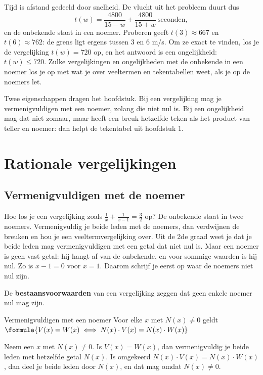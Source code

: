Tijd is afstand gedeeld door snelheid. De vlucht uit het probleem duurt dus
\[t(w) = \frac{4800}{15 - w} + \frac{4800}{15 + w} \ \text{seconden} ,\]
en de onbekende staat in een noemer. Proberen geeft $t(3) \approx 667$ en $t(6) \approx 762$: de grens ligt ergens tussen $3$ en $6$ m/s. Om ze exact te vinden, los je de vergelijking $t(w) = 720$ op, en het antwoord is een ongelijkheid: $t(w) \leqslant 720$. Zulke vergelijkingen en ongelijkheden met de onbekende in een noemer los je op met wat je over veeltermen en tekentabellen weet, als je op de noemers let.

Twee eigenschappen dragen het hoofdstuk. Bij een vergelijking mag je vermenigvuldigen met een noemer, zolang die niet nul is. Bij een ongelijkheid mag dat niet zomaar, maar heeft een breuk hetzelfde teken als het product van teller en noemer: dan helpt de tekentabel uit hoofdstuk 1.

\begin{oefeningen}[Start]

\end{oefeningen}

\section{Rationale vergelijkingen}

\subsection{Vermenigvuldigen met de noemer}

Hoe los je een vergelijking zoals $\frac{1}{x} + \frac{1}{x - 1} = \frac32$ op? De onbekende staat in twee noemers. Vermenigvuldig je beide leden met de noemers, dan verdwijnen de breuken en hou je een veeltermvergelijking over. Uit de 2de graad weet je dat je beide leden mag vermenigvuldigen met een getal dat niet nul is. Maar een noemer is geen vast getal: hij hangt af van de onbekende, en voor sommige waarden is hij nul. Zo is $x - 1 = 0$ voor $x = 1$. Daarom schrijf je eerst op waar de noemers niet nul zijn.

\begin{theorie}
De \textbf{\textcolor{accent}{bestaansvoorwaarden}} van een vergelijking zeggen dat geen enkele noemer nul mag zijn.

\begin{stelling}{Vermenigvuldigen met een noemer}
Voor elke $x$ met $N(x) \neq 0$ geldt \quad $\formule{V(x) = W(x) \iff N(x) \cdot V(x) = N(x) \cdot W(x)}$
\end{stelling}

\begin{bewijs}
Neem een $x$ met $N(x) \neq 0$. Is $V(x) = W(x)$, dan vermenigvuldig je beide leden met hetzelfde getal $N(x)$. Is omgekeerd $N(x) \cdot V(x) = N(x) \cdot W(x)$, dan deel je beide leden door $N(x)$, en dat mag omdat $N(x) \neq 0$.
\end{bewijs}
\end{theorie}

